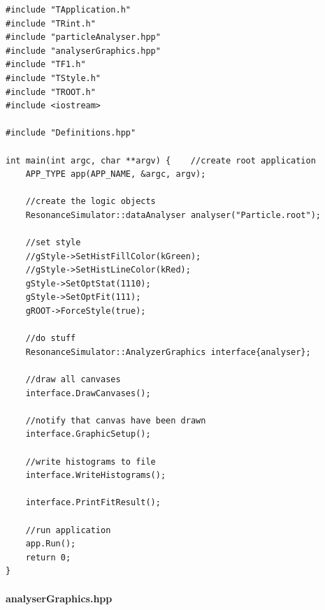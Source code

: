\documentclass[12pt, a4paper]{article}
\begin{document}
\begin{verbatim}
#include "TApplication.h"
#include "TRint.h"
#include "particleAnalyser.hpp"
#include "analyserGraphics.hpp"
#include "TF1.h"
#include "TStyle.h"
#include "TROOT.h"
#include <iostream>

#include "Definitions.hpp"

int main(int argc, char **argv) {    //create root application
    APP_TYPE app(APP_NAME, &argc, argv);

    //create the logic objects
    ResonanceSimulator::dataAnalyser analyser("Particle.root");

    //set style
    //gStyle->SetHistFillColor(kGreen);
    //gStyle->SetHistLineColor(kRed);
    gStyle->SetOptStat(1110);
    gStyle->SetOptFit(111);
    gROOT->ForceStyle(true);

    //do stuff
    ResonanceSimulator::AnalyzerGraphics interface{analyser};

    //draw all canvases
    interface.DrawCanvases();

    //notify that canvas have been drawn
    interface.GraphicSetup();

    //write histograms to file
    interface.WriteHistograms();

    interface.PrintFitResult();

    //run application
    app.Run();
    return 0;
}
\end{verbatim}

\paragraph{analyserGraphics.hpp}
\end{document}
